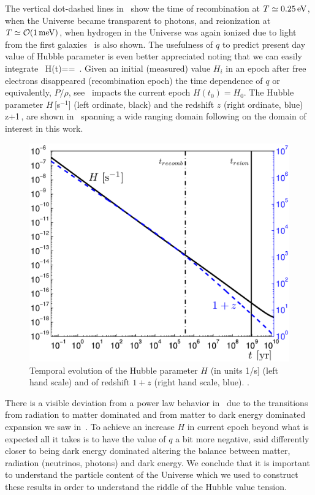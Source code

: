 The vertical dot-dashed lines in~ show the time of recombination at $T\simeq0.25\text{\,eV}$, when the Universe became transparent to photons, and reionization at $T\simeq {\cal O}(1\meV)$, when hydrogen in the Universe was again ionized due to light from the first galaxies~\cite{Zaroubi:2012in} is also shown. The usefulness of $q$ to predict present day value of Hubble parameter is even better appreciated noting that we can easily integrate~ 
\beqn\label{eq:HdotInt}
H(t)==
\,.
\eeqn
Given an initial (measured) value $H_i$ in an epoch after free electrons disappeared (recombination epoch) the time dependence of $q$ or equivalently, $P/\rho$, see~ impacts the current epoch $H(t_0)=H_0$. The Hubble parameter 
$H$\,[s$^{-1}$] (left ordinate, black) and the redshift $z$ (right ordinate, blue) 
\beqn\label{eq:zdef}
z+1\equiv {}\,,
\eeqn
are shown in~ spanning a wide ranging domain following on the domain of interest in this work. 

\begin{figure}
\centerline{\includegraphics[width=0.90\linewidth]{plots/Hztoday.png}}
\caption{Temporal evolution of the Hubble parameter $H$ (in units 1/s] (left hand scale) and of redshift $1+z$ (right hand scale, blue). . 
\label{fig:today1} }
\end{figure}


There is a visible deviation from a power law behavior in~ due to the transitions from radiation to matter dominated and from matter to dark energy dominated expansion we saw in~. To achieve an increase $H$ in current epoch beyond what is expected all it takes is to have the value of $q$ a bit more negative, said differently closer to being dark energy dominated altering the balance between matter, radiation (neutrinos, photons) and dark energy. We conclude that it is important to understand the particle content of the Universe which we used to construct these results in order to understand the riddle of the Hubble value tension.


